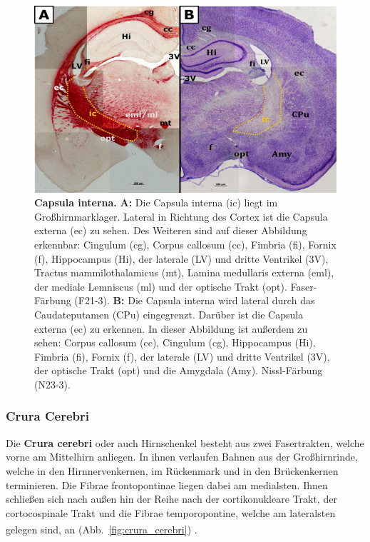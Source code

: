 \documentclass[12pt,a4paper,pdftex]{article}
\begin{document}
\begin{figure}[H]
    \centering
    \includegraphics[width=\textwidth]{pictures/Bilder_Laura/internal_capsule_F21_3P_025x_N23_3P_025x.png}
    \caption[Capsula interna]{\textbf{Capsula interna.} \textbf{A:} Die Capsula interna (ic) liegt im Großhirnmarklager. Lateral in Richtung des Cortex ist die Capsula externa (ec) zu sehen. Des Weiteren sind auf dieser Abbildung erkennbar: Cingulum (cg), Corpus callosum (cc), Fimbria (fi), Fornix (f), Hippocampus (Hi), der laterale (LV) und dritte Ventrikel (3V), Tractus mammilothalamicus (mt), Lamina medullaris externa (eml), der mediale Lemniscus (ml) und der optische Trakt (opt). Faser-Färbung (F21-3). \textbf{B:} Die Capsula interna wird lateral durch das Caudateputamen (CPu) eingegrenzt. Darüber ist die Capsula externa (ec) zu erkennen. In dieser Abbildung ist außerdem zu sehen: Corpus callosum (cc), Cingulum (cg), Hippocampus (Hi), Fimbria (fi), Fornix (f), der laterale (LV) und dritte Ventrikel (3V), der optische Trakt (opt) und die Amygdala (Amy). Nissl-Färbung (N23-3).}
    \label{fig:Capsula_interna}
\end{figure}


\subsubsection*{Crura Cerebri} 
Die \textbf{Crura cerebri} oder auch Hirnschenkel besteht aus zwei Fasertrakten, welche vorne am Mittelhirn anliegen. In ihnen verlaufen Bahnen aus der Großhirnrinde, welche in den Hirnnervenkernen, im Rückenmark und in den Brückenkernen terminieren. Die Fibrae frontopontinae liegen dabei am medialsten. Ihnen schließen sich nach außen hin der Reihe nach der cortikonukleare Trakt, der cortocospinale Trakt und die Fibrae temporopontine, welche am lateralsten gelegen sind, an (Abb.~\ref{fig:crura_cerebri}) \textsuperscript{\cite[6]{trepel2011neuroanatomie}}.
\end{document}

